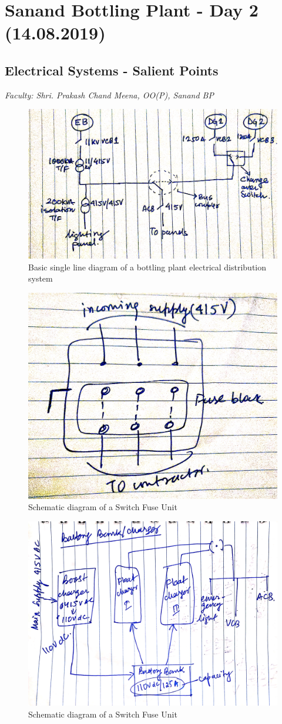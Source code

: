 \documentclass{report}
\begin{document}
	\section{Sanand Bottling Plant - Day 2 (14.08.2019)}
	\subsection{Electrical Systems - Salient Points}
	\textit{Faculty: Shri. Prakash Chand Meena, OO(P), Sanand BP}\\
	\begin{figure}[h]
		\centering
		\includegraphics[width=\linewidth]{bp_singlelinediag}
		\caption{Basic single line diagram of a bottling plant electrical distribution system}
		\label{bp_singlelinediag}
	\end{figure}
	\begin{figure}[h]
		\centering
		\includegraphics[width=0.5\linewidth]{sfu}
		\caption{Schematic diagram of a Switch Fuse Unit}
		\label{sfu}
	\end{figure}
	\begin{figure}[h]
		\centering
		\includegraphics[width=0.5\linewidth]{dc_distribution}
		\caption{Schematic diagram of a Switch Fuse Unit}
		\label{dc_distribution}
	\end{figure}
\end{document}
